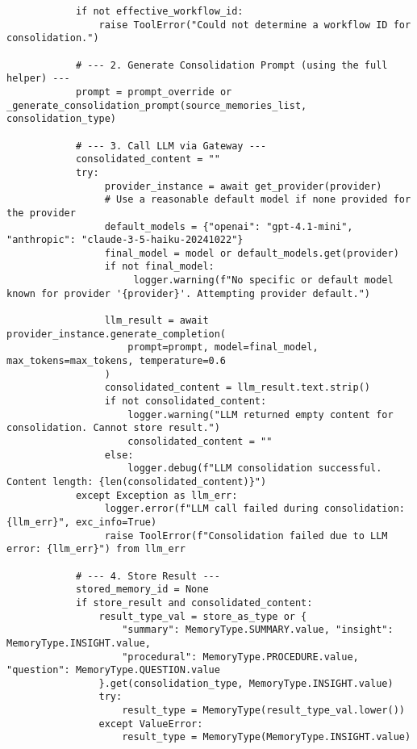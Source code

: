\documentclass[12pt,a4paper]{article}
\begin{document}
\begin{pageablecode}
\begin{verbatim}
            if not effective_workflow_id:
                raise ToolError("Could not determine a workflow ID for consolidation.")

            # --- 2. Generate Consolidation Prompt (using the full helper) ---
            prompt = prompt_override or _generate_consolidation_prompt(source_memories_list, consolidation_type)

            # --- 3. Call LLM via Gateway ---
            consolidated_content = ""
            try:
                 provider_instance = await get_provider(provider)
                 # Use a reasonable default model if none provided for the provider
                 default_models = {"openai": "gpt-4.1-mini", "anthropic": "claude-3-5-haiku-20241022"}
                 final_model = model or default_models.get(provider)
                 if not final_model:
                      logger.warning(f"No specific or default model known for provider '{provider}'. Attempting provider default.")
                 
                 llm_result = await provider_instance.generate_completion(
                     prompt=prompt, model=final_model, max_tokens=max_tokens, temperature=0.6
                 )
                 consolidated_content = llm_result.text.strip()
                 if not consolidated_content:
                     logger.warning("LLM returned empty content for consolidation. Cannot store result.")
                     consolidated_content = ""
                 else:
                     logger.debug(f"LLM consolidation successful. Content length: {len(consolidated_content)}")
            except Exception as llm_err:
                 logger.error(f"LLM call failed during consolidation: {llm_err}", exc_info=True)
                 raise ToolError(f"Consolidation failed due to LLM error: {llm_err}") from llm_err

            # --- 4. Store Result ---
            stored_memory_id = None
            if store_result and consolidated_content:
                result_type_val = store_as_type or {
                    "summary": MemoryType.SUMMARY.value, "insight": MemoryType.INSIGHT.value,
                    "procedural": MemoryType.PROCEDURE.value, "question": MemoryType.QUESTION.value
                }.get(consolidation_type, MemoryType.INSIGHT.value)
                try: 
                    result_type = MemoryType(result_type_val.lower())
                except ValueError: 
                    result_type = MemoryType(MemoryType.INSIGHT.value)


\end{verbatim}
\end{pageablecode}
\end{document}
